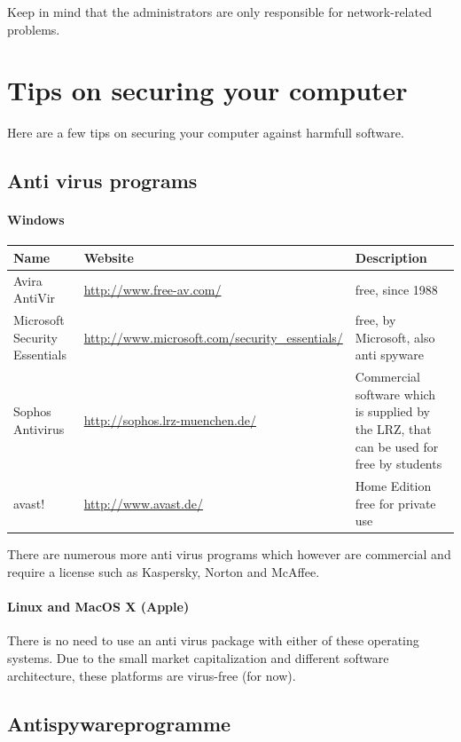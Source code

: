 \documentclass[a4paper,12pt]{scrartcl}
\begin{document}
Keep in mind that the administrators are only responsible for network-related problems.

\newpage
\section*{Tips on securing your computer}

Here are a few tips on securing your computer against harmfull software.

\subsection*{Anti virus programs}
\paragraph*{Windows}
\begin{center}
  \begin{tabularx}{\linewidth}{|p{.2\linewidth}XX|}
    \hline
    Name & Website & Description\\
    \hline \hline
    Avira AntiVir & \url{http://www.free-av.com/} & free, since 1988\\
    \hline
    Microsoft Security Essentials & \url{http://www.microsoft.com/security\_essentials/} & free, by Microsoft, also anti spyware\\
    \hline
    Sophos Antivirus & \url{http://sophos.lrz-muenchen.de/} & Commercial software which is supplied by the LRZ, that can be used for free by students\\
    \hline
    avast! & \url{http://www.avast.de/} & Home Edition free for private use\\
    \hline
  \end{tabularx}
\end{center}

There are numerous more anti virus programs which however are commercial and require a license such as Kaspersky, Norton and McAffee.

\paragraph*{Linux and MacOS X (Apple)}

There is no need to use an anti virus package with either of these operating systems. Due to the small market capitalization and different software architecture, these platforms are virus-free (for now).
\subsection*{Antispywareprogramme}
\end{document}
